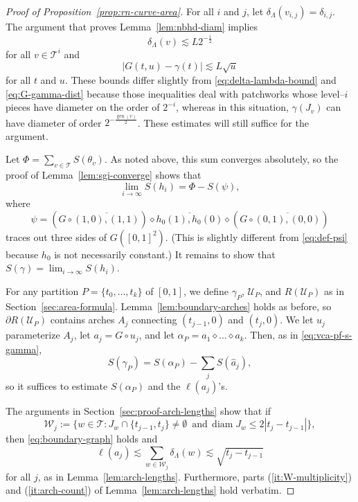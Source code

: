 \documentclass[10pt,a4paper]{amsart}
\newcommand{\cT}{\mathcal{T}}
\newcommand{\cU}{\mathcal{U}}
\newcommand{\cW}{\mathcal{W}}
\DeclareMathOperator{\diam}{diam}
\DeclareMathOperator{\gen}{gen}
\begin{document}
\begin{proof}[Proof of Proposition~\ref{prop:rn-curve-area}]
  For all $i$ and $j$, let $\delta_\Lambda(v_{i,j}) = \delta_{i,j}$. The argument that proves Lemma~\ref{lem:nbhd-diam} implies
  \begin{equation}\label{eqn:EstimateDeltaLambdarn}
    \delta_\Lambda(v) \lesssim L 2^{-\frac{i}{2}}
  \end{equation}
  for all $v\in \cT^i$ and   
  \begin{equation}\label{eqn:Gtu}
    |G(t,u)-\gamma(t)|\lesssim L \sqrt{u}
  \end{equation}
  for all $t$ and $u$.  These bounds differ slightly from \eqref{eq:delta-lambda-bound} and \eqref{eq:G-gamma-dist} because those inequalities deal with patchworks whose level--$i$ pieces have diameter on the order of $2^{-i}$, whereas in this situation, $\gamma(J_v)$ can have diameter of order $2^{-\frac{\gen(v)}{2}}$. These estimates will still suffice for the argument.

  Let $\Phi = \sum_{v\in\cT} S(\theta_v)$. As noted above, this sum converges absolutely, so the proof of Lemma~\ref{lem:sgi-converge} shows that
  \[
    \lim_{i\to\infty} S(h_i)=\Phi-S(\psi),
  \]
  where
  $$\psi = (G\circ \overline{(1,0),(1,1)}) \diamond \overline{h_0(1), h_0(0)}\diamond (G\circ \overline{(0,1),(0,0)})$$
  traces out three sides of $G([0,1]^2)$.
  (This is slightly different from \eqref{eq:def-psi} because $h_0$ is not necessarily constant.)
  It remains to show that $S(\gamma) = \lim_{i\to \infty} S(h_i)$.

  For any partition $P=\{t_0,\dots,t_k\}$ of $[0,1]$, we define $\gamma_P$, $\cU_P$, and $R(\cU_P)$ as in Section~\ref{sec:area-formula}.
  Lemma~\ref{lem:boundary-arches} holds as before, so $\partial R(\cU_P)$ contains arches $A_j$ connecting $(t_{j-1},0)$ and $(t_j,0)$. We let $u_j$ parameterize $A_j$, let $a_j = G\circ u_j$, and let $\alpha_P = a_1\diamond \dots \diamond a_k$. Then, as in \eqref{eq:vca-pf-s-gamma}, 
  \begin{equation}\label{eq:s-gamma-s-alpha-rn}
    S(\gamma_P) = S(\alpha_P) - \sum_j S(\hat{a}_j),
  \end{equation}
  so it suffices to estimate $S(\alpha_P)$ and the $\ell(a_j)$'s.

  The arguments in Section~\ref{sec:proof-arch-lengths} show that if
  \begin{equation}\label{eq:def-cwjrn}
    \cW_j := \{w\in \cT : J_w\cap \{t_{j-1},t_j\} \ne \emptyset\, \text{ and}\, \diam J_w \leq 2|t_j-t_{j-1}|\},
  \end{equation}
  then \eqref{eq:boundary-graph} holds and 
  \begin{equation}\label{eq:alpha-length-rn}
    \ell(a_j) \lesssim \sum_{w\in \cW_j} \delta_\Lambda(w) \lesssim \sqrt{t_{j}- t_{j-1}}
  \end{equation}
  for all $j$, as in Lemma~\ref{lem:arch-lengths}. Furthermore, parts (\ref{it:W-multiplicity}) and (\ref{it:arch-count}) of Lemma~\ref{lem:arch-lengths} hold verbatim.


\end{proof}
\end{document}
